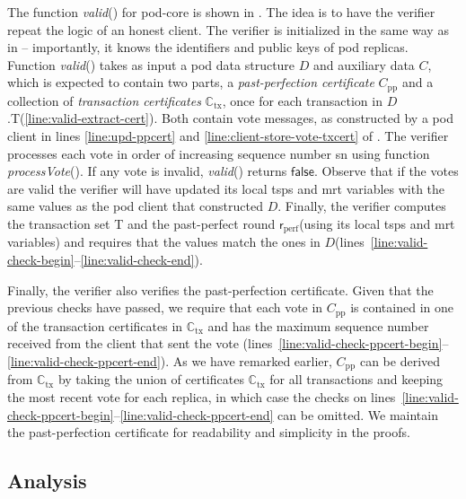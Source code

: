 \documentclass[pdflatex,sn-mathphys-num]{sn-jnl}%
\theoremstyle{thmstyleone}%
\theoremstyle{thmstyletwo}%
\theoremstyle{thmstylethree}%
\newcommand{\podtm}{\textsf{pod}\xspace}
\newcommand{\false}{\mathsf{false}}
\newcommand{\op}[1]{\textsl{#1}}
\newcommand{\opValid}[1]{\op{valid}(#1)\xspace}
\newcommand{\operand}[1]{\textsf{#1}}
\newcommand{\round}{\operand{r}\xspace}
\newcommand{\rperf}{\ensuremath{\round_\text{perf}}\xspace}
\newcommand{\mrt}{\operand{mrt}\xspace}
\newcommand{\tsps}{\operand{tsps}\xspace}
\newcommand{\alltxcert}{\ensuremath{\mathbb{C}_\text{tx}}\xspace}
\newcommand{\ppcert}{\ensuremath{C_\text{pp}}\xspace}
\newcommand{\cert}{\ensuremath{C}\xspace}
\newcommand{\txSet}{\operand{T}\xspace}
\newcommand{\Pod}{\ensuremath{D}\xspace}
\newcommand{\sn}{\operand{sn}\xspace}
\newcommand{\opProcessVote}[1]{\op{processVote}(#1)\xspace}
\begin{document}
The function \opValid{} for \podtm-core is shown in .
The idea is to have the verifier repeat the logic of an honest client.
The verifier is initialized in the same way as in  -- importantly, it knows the identifiers and public keys of \podtm replicas.
Function \opValid{} takes as input a pod data structure \Pod and auxiliary data \cert,
which is expected to contain two parts, a \emph{past-perfection certificate} \ppcert and a collection of \emph{transaction certificates} $\alltxcert$, once for each transaction in \Pod.\txSet (\cref{line:valid-extract-cert}).
Both contain vote messages, as constructed by a \podtm client in lines \ref{line:upd-ppcert} and \ref{line:client-store-vote-txcert} of .
The verifier processes each vote in order of increasing sequence number \sn using function \opProcessVote{}. If any vote is invalid, \opValid{} returns $\false$.
Observe that if the votes are valid the verifier will have updated its local \tsps and \mrt variables with the same values as the \podtm client that constructed \Pod.
Finally, the verifier computes the transaction set \txSet and the past-perfect round \rperf (using its local \tsps and \mrt variables) and requires that the values match the ones in \Pod (lines~\ref{line:valid-check-begin}--\ref{line:valid-check-end}).

Finally, the verifier also verifies the past-perfection certificate. Given that the previous checks have passed, we require that each vote in \ppcert is contained in one of the transaction certificates in \alltxcert and has the maximum sequence number received from the client that sent the vote (lines~\ref{line:valid-check-ppcert-begin}--\ref{line:valid-check-ppcert-end}).
As we have remarked earlier, \ppcert can be derived from \alltxcert by taking the union of certificates $\alltxcert$ for all transactions and keeping the most recent vote for each replica, in which case the checks on lines~\ref{line:valid-check-ppcert-begin}--\ref{line:valid-check-ppcert-end} can be omitted. We maintain the past-perfection certificate for readability and simplicity in the proofs.


\subsection{Analysis}
\end{document}
